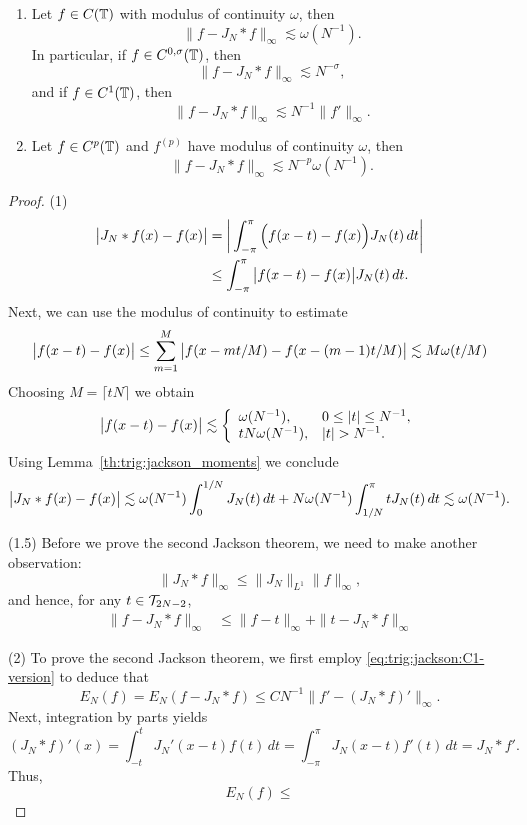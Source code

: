 \begin{theorem} \label{th:trig:jackson}
  \begin{enumerate}
  \item Let $f \in C(\mathbb{T})$ with modulus of continuity $\omega$, then
  \[
      \| f - J_N \ast f \|_\infty \lesssim \omega(N^{-1}).
  \]
  In particular, if $f \in C^{0,\sigma}(\mathbb{T})$, then
  \[
      \|f - J_N \ast f \|_\infty \lesssim N^{-\sigma},
  \]
  and if $f \in C^1(\mathbb{T})$, then
  \begin{equation} \label{eq:trig:jackson:C1-version}
    \|f - J_N \ast f \|_\infty \lesssim N^{-1} \|f'\|_\infty.
  \end{equation}
  \item Let $f \in C^p(\mathbb{T})$ and $f^{(p)}$ have modulus of continuity $\omega$,
  then
  \[
      \| f - J_N\ast f \|_\infty \lesssim N^{-p} \omega(N^{-1}).
  \]
  \end{enumerate}
\end{theorem}
\begin{proof}
  (1)
  \begin{align*}
    \big| J_N \ast f(x) - f(x) \big|
    &=
    \bigg| \int_{-\pi}^\pi \Big( f(x-t) - f(x) \Big) J_N(t) \, dt \bigg| \\
    &\leq
    \int_{-\pi}^\pi \big|f(x-t) - f(x) \big| J_N(t) \, dt.
  \end{align*}
  Next, we can use the modulus of continuity to estimate
  \[
    \big|f(x-t) - f(x) \big| \leq \sum_{m = 1}^M
      \big| f(x - mt/M) - f(x - (m-1)t/M) \big|
    \lesssim M \omega(t/M)
  \]
  Choosing $M = \lceil tN \rceil$ we obtain
  \[
    \big|f(x-t) - f(x) \big| \lesssim
      \left\{ \begin{array}{ll} 
        \omega(N^{-1}), & 0 \leq |t| \leq N^{-1}, \\
        t N \omega(N^{-1}), & |t| > N^{-1}.
       \end{array} \right.
  \]
  Using Lemma~\ref{th:trig:jackson_moments} we conclude
  \[
    \big| J_N \ast f(x) - f(x) \big|
    \lesssim
      \omega(N^{-1}) \int_0^{1/N} J_N(t) \, dt
      + N \omega(N^{-1}) \int_{1/N}^{\pi} t J_N(t)\, dt
    \lesssim \omega(N^{-1}).
  \]

  (1.5) Before we prove the second Jackson theorem, we need
  to make another observation:
  \[
    \| J_N \ast f \|_\infty
    \leq \|J_N \|_{L^1} \|f\|_\infty,
  \]
  and hence, for any $t \in \mathcal{T}_{2N-2}$,
  \begin{align*}
      \|f - J_N \ast f\|_\infty
      &\leq
      \|f - t\|_\infty + \| t - J_N \ast f \|_\infty
  \end{align*}

  (2) To prove the second Jackson theorem, we first employ
  \eqref{eq:trig:jackson:C1-version} to deduce that
  \[
      E_N(f) = E_N(f - J_N \ast f)
      \leq
      C N^{-1} \| f' - (J_N \ast f)' \|_\infty.
  \]
  Next, integration by parts yields
  \[
     (J_N \ast f)'(x) = \int_{-t}^t J_N'(x-t) f(t) \,dt
     = \int_{-\pi}^\pi J_N(x-t) f'(t) \,dt
     = J_N \ast f'.
  \]
  Thus,
  \[
    E_N(f) \leq
  \]

\end{proof}

